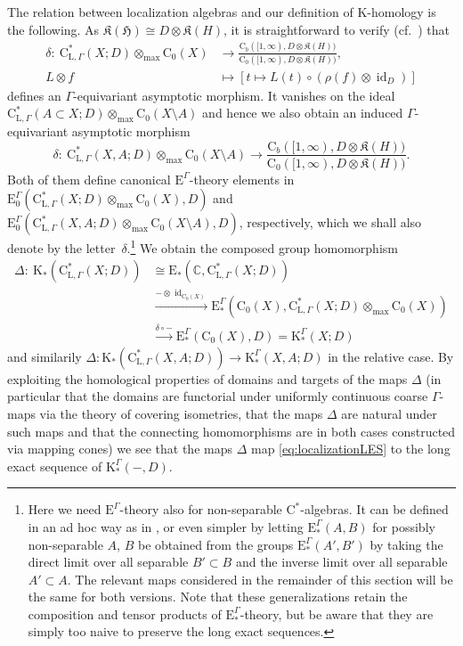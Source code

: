 \documentclass[pdftex]{sigma}
\numberwithin{equation}{section}
\theoremstyle{definition}
\newcommand{\C}{\mathbb{C}}
\newcommand{\Ct}{\mathrm{C}}
\newcommand{\Cz}{\Ct_0}
\newcommand{\Cb}{\Ct_b}
\newcommand{\HilbertMod}{\mathfrak{H}}
\DeclareMathOperator{\id}{id}
\newcommand{\maxtensor}{\mathbin{{\otimes}_{\mathrm{max}}}}
\newcommand{\K}{\mathrm{K}}
\newcommand{\EE}{\mathrm{E}}
\newcommand{\textCstar}{\ensuremath{\mathrm{C}^*\!}}
\newcommand{\Loc}{\mathrm{C}^*_{\mathrm{L},\Gamma}}
\newcommand{\Kom}{{\mathfrak{K}}}
\newcommand{\blank}{-}
\begin{document}
The relation between localization algebras and our definition of $\K$-homology is the following. As $\Kom(\HilbertMod)\cong D\otimes\Kom(H)$, it is straightforward to verify (cf.\ \cite[Corollary~4.2]{QiaoRoe}) that
\begin{align*}
\delta\colon\ \Loc(X;D)\maxtensor\Cz(X) &\to\frac{\Cb([1,\infty),D\otimes \Kom(H))}{\Cz([1,\infty),D\otimes\Kom(H))},
\\
L\otimes f&\mapsto [t\mapsto L(t)\circ (\rho(f)\otimes\id_D)]
\end{align*}
defines an $\Gamma$-equivariant asymptotic morphism. It vanishes on the ideal $\Loc(A\subset X;D)\maxtensor\Cz(X\setminus A)$ and hence we also obtain an induced $\Gamma$-equivariant asymptotic morphism
\[
\delta\colon\ \Loc(X,A;D)\maxtensor\Cz(X\setminus A) \to\frac{\Cb([1,\infty),D\otimes \Kom(H))}{\Cz([1,\infty),D\otimes\Kom(H))}.
\]
Both of them define canonical $\EE^\Gamma$-theory elements in $\EE^\Gamma_0(\Loc(X;D)\maxtensor\Cz(X),D)$ and \linebreak $\EE^\Gamma_0(\Loc(X,A;D)\maxtensor\Cz(X\setminus A),D)$, respectively, which we shall also denote by the letter~$\delta$.\footnote{Here we need $\EE^\Gamma$-theory also for non-separable \textCstar-algebras. It can be defined in an ad hoc way as in \cite[Section~1]{WulffTwisted}, or even simpler by letting $\EE^\Gamma_*(A,B)$ for possibly non-separable $A$, $B$ be obtained from the groups $\EE^\Gamma_*(A',B')$ by taking the direct limit over all separable $B'\subset B$ and the inverse limit over all separable $A'\subset A$. The relevant maps considered in the remainder of this section will be the same for both versions.
Note that these generalizations retain the composition and tensor products of $\EE^\Gamma_*$-theory, but be aware that they are simply too naive to preserve the long exact sequences. }
We obtain the composed group homomorphism
\begin{align*}
\Delta\colon\ \K_*(\Loc(X;D))&\cong\EE_*(\C,\Loc(X;D))
\\&\xrightarrow{\blank\otimes\id_{\Cz(X)}}\EE^\Gamma_*(\Cz(X),\Loc(X;D)\maxtensor\Cz(X))
\\&\xrightarrow{\delta\circ\blank}\EE^\Gamma_*(\Cz(X),D)=\K^\Gamma_*(X;D)
\end{align*}
and similarily $\Delta\colon \K_*(\Loc(X,A;D))\to\K^\Gamma_*(X,A;D)$ in the relative case.
By exploiting the homological properties of domains and targets of the maps $\Delta$ (in particular that the domains are functorial under uniformly continuous coarse $\Gamma$-maps via the theory of covering isometries, that the maps $\Delta$ are natural under such maps and that the connecting homomorphisms are in both cases constructed via mapping cones) we see that the maps $\Delta$ map \eqref{eq:localizationLES} to the long exact sequence of $\K^\Gamma_*(\blank,D)$.
\end{document}
